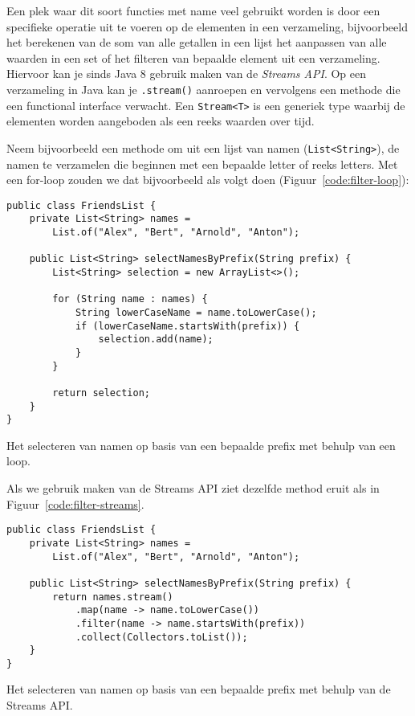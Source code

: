\documentclass[dutch,a4paper,12pt,doubleside]{book}
\begin{document}
Een plek waar dit soort functies met name veel gebruikt worden is door een 
specifieke operatie uit te voeren op de elementen in een verzameling, bijvoorbeeld
het berekenen van de som van alle getallen in een lijst 
het aanpassen van alle waarden in een set of 
het filteren van bepaalde element uit een verzameling.
Hiervoor kan je sinds Java 8 gebruik maken van de \textit{Streams API}.
Op een verzameling in Java kan je \texttt{.stream()} aanroepen en vervolgens 
een methode die een functional interface verwacht. Een \texttt{Stream<T>} is 
een generiek type waarbij de elementen worden aangeboden als een reeks waarden over tijd.

Neem bijvoorbeeld een methode om uit een lijst van namen (\texttt{List<String>}),
de namen te verzamelen die beginnen met een bepaalde letter of reeks letters.
Met een for-loop zouden we dat bijvoorbeeld als volgt doen (Figuur~\ref{code:filter-loop}):

\begin{listing}[H]
\begin{verbatim}
public class FriendsList {
    private List<String> names = 
        List.of("Alex", "Bert", "Arnold", "Anton");

    public List<String> selectNamesByPrefix(String prefix) {
        List<String> selection = new ArrayList<>();

        for (String name : names) {
            String lowerCaseName = name.toLowerCase();
            if (lowerCaseName.startsWith(prefix)) {
                selection.add(name);
            }
        }

        return selection;
    }
}
\end{verbatim}
\caption{Het selecteren van namen op basis van een bepaalde prefix met behulp van een loop.}
\label{code:filter-loop}
\end{listing}

Als we gebruik maken van de Streams API ziet dezelfde method eruit als in Figuur~\ref{code:filter-streams}.

\begin{listing}[H]
\begin{verbatim}
public class FriendsList {
    private List<String> names = 
        List.of("Alex", "Bert", "Arnold", "Anton");

    public List<String> selectNamesByPrefix(String prefix) {
        return names.stream()
            .map(name -> name.toLowerCase())
            .filter(name -> name.startsWith(prefix))
            .collect(Collectors.toList());
    }
}
\end{verbatim}
\caption{Het selecteren van namen op basis van een bepaalde prefix met behulp van de Streams API.}
\label{code:filter-loop}
\end{listing}
\end{document}
